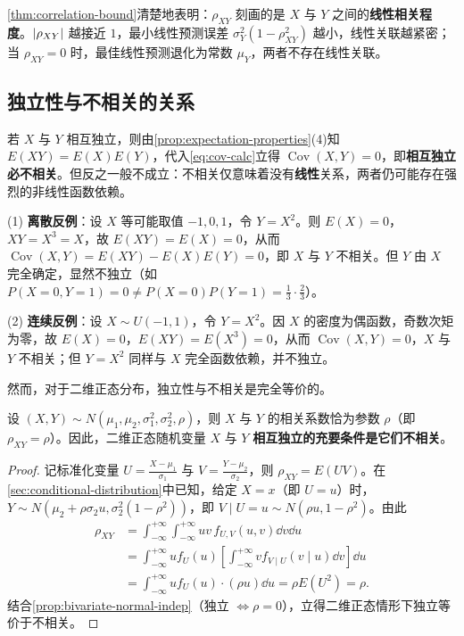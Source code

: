 \cref{thm:correlation-bound}清楚地表明：$\rho_{XY}$ 刻画的是 $X$ 与 $Y$ 之间的\textbf{线性相关程度}。$\lvert\rho_{XY}\rvert$ 越接近 $1$，最小线性预测误差 $\sigma_Y^2(1-\rho_{XY}^2)$ 越小，线性关联越紧密；当 $\rho_{XY}=0$ 时，最佳线性预测退化为常数 $\mu_Y$，两者不存在线性关联。

\subsection{独立性与不相关的关系}

若 $X$ 与 $Y$ 相互独立，则由\cref{prop:expectation-properties}(4)知 $E(XY)=E(X)E(Y)$，代入\eqref{eq:cov-calc}立得 $\operatorname{Cov}(X,Y)=0$，即\textbf{相互独立必不相关}。但反之一般不成立：不相关仅意味着没有\textbf{线性}关系，两者仍可能存在强烈的非线性函数依赖。

\begin{example}[title={不相关但完全函数依赖的两个反例}]
\label{eg:uncorrelated-dependent}
(1) \textbf{离散反例}：设 $X$ 等可能取值 $-1,0,1$，令 $Y=X^2$。则 $E(X)=0$，$XY=X^3=X$，故 $E(XY)=E(X)=0$，从而 $\operatorname{Cov}(X,Y)=E(XY)-E(X)E(Y)=0$，即 $X$ 与 $Y$ 不相关。但 $Y$ 由 $X$ 完全确定，显然不独立（如 $P(X=0,Y=1)=0\ne P(X=0)P(Y=1)=\frac{1}{3}\cdot\frac{2}{3}$）。

(2) \textbf{连续反例}：设 $X\sim U(-1,1)$，令 $Y=X^2$。因 $X$ 的密度为偶函数，奇数次矩为零，故 $E(X)=0$，$E(XY)=E(X^3)=0$，从而 $\operatorname{Cov}(X,Y)=0$，$X$ 与 $Y$ 不相关；但 $Y=X^2$ 同样与 $X$ 完全函数依赖，并不独立。
\end{example}

然而，对于二维正态分布，独立性与不相关是完全等价的。

\begin{proposition}
\label{prop:bivariate-normal-rho}
设 $(X,Y)\sim N(\mu_1,\mu_2,\sigma_1^2,\sigma_2^2,\rho)$，则 $X$ 与 $Y$ 的相关系数恰为参数 $\rho$（即 $\rho_{XY}=\rho$）。因此，二维正态随机变量 $X$ 与 $Y$ \textbf{相互独立的充要条件是它们不相关}。
\end{proposition}
\begin{proof}
记标准化变量 $U=\frac{X-\mu_1}{\sigma_1}$ 与 $V=\frac{Y-\mu_2}{\sigma_2}$，则 $\rho_{XY}=E(UV)$。在\cref{sec:conditional-distribution}中已知，给定 $X=x$（即 $U=u$）时，$Y\sim N(\mu_2+\rho\sigma_2 u,\sigma_2^2(1-\rho^2))$，即 $V\mid U=u\sim N(\rho u,1-\rho^2)$。由此
\[
\begin{aligned}
  \rho_{XY}&=\int_{-\infty}^{+\infty}\int_{-\infty}^{+\infty}uv\,f_{U,V}(u,v)\dd v\dd u\\
  &=\int_{-\infty}^{+\infty}u f_U(u)\left[\int_{-\infty}^{+\infty}v f_{V\mid U}(v\mid u)\dd v\right]\dd u\\
  &=\int_{-\infty}^{+\infty}u f_U(u)\cdot(\rho u)\dd u=\rho E(U^2)=\rho.
\end{aligned}
\]
结合\cref{prop:bivariate-normal-indep}（独立 $\iff\rho=0$），立得二维正态情形下独立等价于不相关。
\end{proof}

